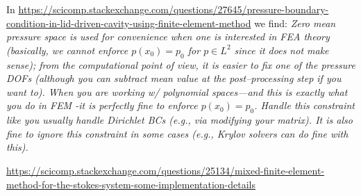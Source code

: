 \Literature

In \url{https://scicomp.stackexchange.com/questions/27645/pressure-boundary-condition-in-lid-driven-cavity-using-finite-element-method}
we find:
{\it 
Zero mean pressure space is used for convenience when one is interested in FEA theory (basically, we cannot 
enforce $p(x_0)=p_0$ for $p \in L^2$ since it does not make sense); from the computational point of view, 
it is easier to fix one of the pressure DOFs (although you can subtract mean value at the post–processing step 
if you want to). When you are working w/ polynomial spaces—and this is exactly what you do in FEM 
-it is perfectly fine to enforce $p(x_0)=p_0$. Handle this constraint like you usually handle Dirichlet 
BCs (e.g., via modifying your matrix). It is also fine to ignore this constraint in some 
cases (e.g., Krylov solvers can do fine with this).
}


\url{
https://scicomp.stackexchange.com/questions/25134/mixed-finite-element-method-for-the-stokes-system-some-implementation-details}





